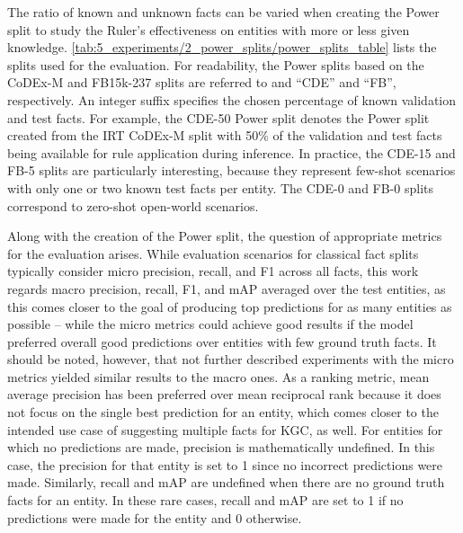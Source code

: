 The ratio of known and unknown facts can be varied when creating the Power split to study the Ruler's effectiveness on entities with more or less given knowledge. \autoref{tab:5_experiments/2_power_splits/power_splits_table} lists the splits used for the evaluation. For readability, the Power splits based on the CoDEx-M and FB15k-237 splits are referred to and ``CDE'' and ``FB'', respectively. An integer suffix specifies the chosen percentage of known validation and test facts. For example, the CDE-50 Power split denotes the Power split created from the IRT CoDEx-M split with 50\% of the validation and test facts being available for rule application during inference. In practice, the CDE-15 and FB-5 splits are particularly interesting, because they represent few-shot scenarios with only one or two known test facts per entity. The CDE-0 and FB-0 splits correspond to zero-shot open-world scenarios.

Along with the creation of the Power split, the question of appropriate metrics for the evaluation arises. While evaluation scenarios for classical fact splits typically consider micro precision, recall, and F1 across all facts, this work regards macro precision, recall, F1, and mAP averaged over the test entities, as this comes closer to the goal of producing top predictions for as many entities as possible -- while the micro metrics could achieve good results if the model preferred overall good predictions over entities with few ground truth facts. It should be noted, however, that not further described experiments with the micro metrics yielded similar results to the macro ones. As a ranking metric, mean average precision has been preferred over mean reciprocal rank because it does not focus on the single best prediction for an entity, which comes closer to the intended use case of suggesting multiple facts for KGC, as well. For entities for which no predictions are made, precision is mathematically undefined. In this case, the precision for that entity is set to 1 since no incorrect predictions were made. Similarly, recall and mAP are undefined when there are no ground truth facts for an entity. In these rare cases, recall and mAP are set to 1 if no predictions were made for the entity and 0 otherwise.
